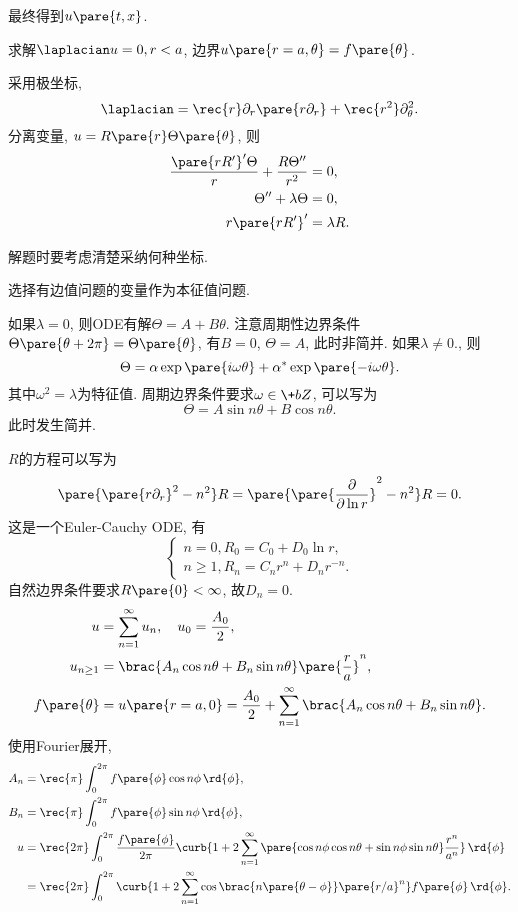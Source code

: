 \documentclass[hidelinks]{ctexart}
\begin{document}
最终得到$u\pare{t,x}$.
\begin{ex}
    求解$\laplacian u = 0, r<a$, 边界$u\pare{r=a,\theta} = f\pare{\theta}$.
\end{ex}
采用极坐标,
\[ \laplacian = \rec{r}\partial_r\pare{r\partial_r} + \rec{r^2}\partial_\theta^2. \]
分离变量, $u=R\pare{r}\Theta\pare{\theta}$, 则
\begin{align*}
    \frac{\pare{rR'}'\Theta}{r} + \frac{R\Theta''}{r^2} &= 0, \\
    \Theta'' + \lambda\Theta &= 0,\\
    r\pare{rR'}' &= \lambda R.
\end{align*}
\begin{remark}
    解题时要考虑清楚采纳何种坐标.
\end{remark}
\begin{ex}
    选择有边值问题的变量作为本征值问题.
\end{ex}
如果$\lambda = 0$, 则ODE有解$\Theta = A+B\theta$. 注意周期性边界条件$\Theta\pare{\theta+2\pi} = \Theta\pare{\theta}$, 有$B=0$, $\Theta = A$, 此时非简并. 如果$\lambda \neq 0$., 则
\[ \Theta = \alpha \exp\pare{i\omega \theta} + \alpha^* \exp\pare{-i\omega\theta}. \]
其中$\omega^2 = \lambda$为特征值. 周期边界条件要求$\omega \in \+bZ$, 可以写为
\[ \Theta = A\sin n\theta + B\cos n\theta. \]
此时发生简并.
\par
$R$的方程可以写为
\[ \pare{\pare{r\partial_r}^2 - n^2}R = \pare{\pare{\frac{\partial}{\partial \ln r}}^2 - n^2}R = 0. \]
这是一个Euler-Cauchy ODE, 有
\[ \begin{cases}
    n=0, R_0 = C_0 + D_0 \ln r,\\
    n\ge 1, R_n = C_nr^n + D_nr^{-n}.
\end{cases} \]
自然边界条件要求$R\pare{0} < \infty$, 故$D_n = 0$.
\begin{align*}
    u &= \sum_{n=1}^\infty u_n, \quad u_0 = \frac{A_0}{2},\\
    u_{n\ge 1} &= \brac{A_n \cos n\theta + B_n \sin n\theta}\pare{\frac{r}{a}}^n,\\
    f\pare{\theta} &= u\pare{r=a,0} = \frac{A_0}{2} + \sum_{n=1}^\infty \brac{A_n \cos n\theta + B_n\sin n\theta}.
\end{align*}
使用Fourier展开,
\begin{align*}
    A_n &= \rec{\pi} \int_0^{2\pi} f\pare{\phi}\cos n\phi \,\rd{\phi}, \\
    B_n &= \rec{\pi} \int_0^{2\pi} f\pare{\phi}\sin n\phi \,\rd{\phi}, \\
    u &= \rec{2\pi} \int_0^{2\pi} \frac{f\pare{\phi}}{2\pi} \curb{1+2\sum_{n=1}^\infty\pare{\cos n\phi \cos n\theta + \sin n\phi \sin n\theta}\frac{r^n}{a^n}}\,\rd{\phi} \\
    &= \rec{2\pi} \int_0^{2\pi}\curb{1+2\sum_{n=1}^\infty \cos\brac{n\pare{\theta - \phi}}\pare{r/a}^n} f\pare{\phi}\,\rd{\phi}.
\end{align*}
\end{document}
